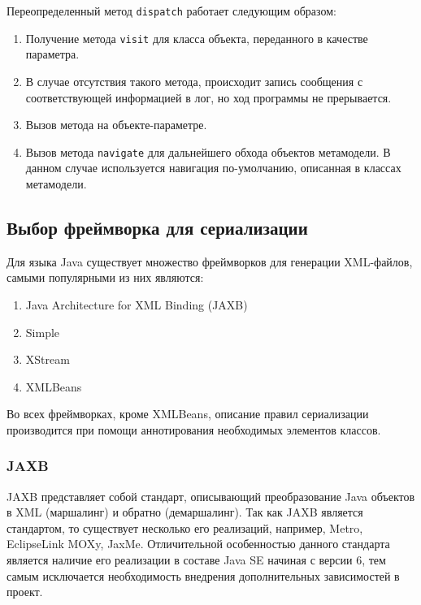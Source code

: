 Переопределенный метод \texttt{dispatch} работает следующим образом:

\begin{enumerate}
    \item Получение метода \texttt{visit} для класса объекта, переданного
    в качестве параметра.
    \item В случае отсутствия такого метода, происходит запись сообщения с
    соответствующей информацией в лог, но ход программы не прерывается.
    \item Вызов метода на объекте-параметре.
    \item Вызов метода \texttt{navigate} для дальнейшего обхода объектов
    метамодели. В данном случае используется навигация по-умолчанию, описанная
    в классах метамодели.
\end{enumerate}

\subsection{Выбор фреймворка для сериализации}

Для языка Java существует множество фреймворков для генерации XML-файлов,
самыми популярными из них являются:


\begin{enumerate}
    \item Java Architecture for XML Binding (JAXB)
    \item Simple
    \item XStream
    \item XMLBeans
 \end{enumerate}

Во всех фреймворках, кроме XMLBeans, описание правил сериализации производится
при помощи аннотирования необходимых элементов классов.

\subsubsection{JAXB}

JAXB представляет собой стандарт, описывающий преобразование Java объектов в XML
(маршалинг) и обратно (демаршалинг). Так как JAXB является стандартом, то
существует несколько его реализаций, например, Metro, EclipseLink MOXy, JaxMe.
Отличительной особенностью данного стандарта является наличие его реализации в
составе Java SE начиная с  версии 6, тем самым исключается необходимость
внедрения дополнительных зависимостей в проект.

